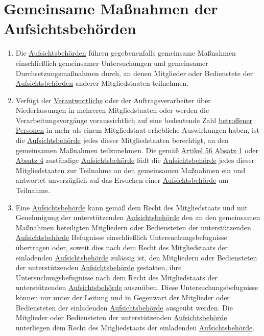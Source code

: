 \chapter{Gemeinsame Maßnahmen der Aufsichtsbehörden}
\label{ch:62}


\begin{enumerate}

  \item Die \hyperref[itm:04-21]{Aufsichtsbehörden} führen gegebenenfalls gemeinsame Maßnahmen einschließlich gemeinsamer Untersuchungen und
   gemeinsamer Durchsetzungsmaßnahmen durch, an denen Mitglieder oder Bedienstete der \hyperref[itm:04-21]{Aufsichtsbehörden} anderer
   Mitgliedstaaten teilnehmen.
  \label{itm:62-1}

  \item Verfügt der \hyperref[itm:04-7]{Verantwortliche} oder der Auftragsverarbeiter über Niederlassungen in mehreren Mitgliedstaaten oder
   werden die Verarbeitungsvorgänge voraussichtlich auf eine bedeutende Zahl \hyperref[itm:04-1]{betroffener Personen} in mehr als einem
   Mitgliedstaat erhebliche Auswirkungen haben, ist die \hyperref[itm:04-21]{Aufsichtsbehörde} jedes dieser Mitgliedstaaten berechtigt, an
   den gemeinsamen Maßnahmen teilzunehmen. Die gemäß \hyperref[itm:56-1]{Artikel 56 Absatz 1} oder \hyperref[itm:56-4]
   {Absatz 4} zuständige \hyperref[itm:04-21]{Aufsichtsbehörde} lädt die \hyperref[itm:04-21]{Aufsichtsbehörde} jedes dieser Mitgliedstaaten zur Teilnahme an den
   gemeinsamen Maßnahmen ein und antwortet unverzüglich auf das Ersuchen einer \hyperref[itm:04-21]{Aufsichtsbehörde} um Teilnahme.
  \label{itm:62-2}

  \item Eine \hyperref[itm:04-21]{Aufsichtsbehörde} kann gemäß dem Recht des Mitgliedstaats und mit Genehmigung der unterstützenden
   \hyperref[itm:04-21]{Aufsichtsbehörde} den an den gemeinsamen Maßnahmen beteiligten Mitgliedern oder Bediensteten der unterstützenden
   \hyperref[itm:04-21]{Aufsichtsbehörde} Befugnisse einschließlich Untersuchungsbefugnisse übertragen oder, soweit dies nach dem Recht des
   Mitgliedstaats der einladenden \hyperref[itm:04-21]{Aufsichtsbehörde} zulässig ist, den Mitgliedern oder Bediensteten der unterstützenden
   \hyperref[itm:04-21]{Aufsichtsbehörde} gestatten, ihre Untersuchungsbefugnisse nach dem Recht des Mitgliedstaats der unterstützenden
   \hyperref[itm:04-21]{Aufsichtsbehörde} auszuüben. Diese Untersuchungsbefugnisse können nur unter der Leitung und in Gegenwart der
   Mitglieder oder Bediensteten der einladenden \hyperref[itm:04-21]{Aufsichtsbehörde} ausgeübt werden. Die Mitglieder oder Bediensteten der
   unterstützenden \hyperref[itm:04-21]{Aufsichtsbehörde} unterliegen dem Recht des Mitgliedstaats der einladenden \hyperref[itm:04-21]{Aufsichtsbehörde}.
  \label{itm:62-3}


\end{enumerate}
